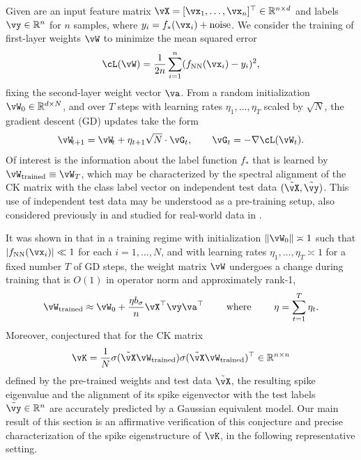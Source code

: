 Given are an input feature matrix
$\vX=[\vx_1,\ldots,\vx_n]^\top \in \R^{n\times d}$ and labels $\vy \in \R^n$
for $n$ samples, where $y_i=f_*(\vx_i)+\text{noise}$.
We consider the training of first-layer weights $\vW$
to minimize the mean squared error
\[\cL(\vW) = {\frac{1}{2n}}\sum_{i=1}^n (f_{\text{NN}}(\vx_i)-y_i)^2,\]
fixing the second-layer weight vector $\va$.
From a random initialization $\vW_0 \in \R^{d \times N}$, and
over $T$ steps with learning rates $\eta_1,\ldots,\eta_T$ scaled by
$\sqrt{N}$, the gradient descent (GD) updates take the form
\begin{equation}\label{eq:trained_W}
	\vW_{\!t+1} = \vW_{\!t} + \eta_{t+1} \sqrt{N}\cdot\vG_t,
\qquad \vG_t=-\nabla\cL(\vW_t).
\end{equation}
Of interest is the information about the label function $f_*$ that is learned by
$\vW_{\text{trained}} \equiv \vW_T$, which may be characterized by the spectral
alignment of the CK matrix with the class label vector on independent
test data $(\tilde \vX,\tilde \vy)$.
This use of independent test data may be understood as a pre-training
setup, also considered previously
in \cite{ba2022high,moniri2023theory} and studied for real-world data in \cite{wei2022more}.

It was shown in \cite{ba2022high} that in a training regime
with initialization $\|\vW_0\| \asymp 1$ such that
$|f_{\text{NN}}(\vx_i)| \ll 1$ for each $i=1,\ldots,N$,
and with learning rates $\eta_1,\ldots,\eta_T \asymp
1$ for a fixed number $T$ of GD steps, the weight matrix $\vW$ undergoes a
change during training that is $O(1)$ in operator norm and approximately rank-1,
\[\vW_{\text{trained}}\approx \vW_0+\frac{\eta b_\sigma}{n}\vX^\top\vy\va^\top \qquad
\text{ where } \qquad \eta=\sum_{t=1}^T \eta_t.\]
Moreover, \cite[Conjecture 4]{ba2022high} conjectured that for the CK matrix
\begin{equation}\label{eq:trained_CK}
\vK=\frac{1}{N} \sigma(\tilde \vX\vW_{\text{trained}})\sigma(\tilde
\vX\vW_{\text{trained}})^\top \in \R^{n \times n}
\end{equation}
defined by the pre-trained weights and test data $\tilde \vX$,
the resulting spike eigenvalue and the alignment of its spike eigenvector with the test labels $\tilde
\vy \in \R^n$ are accurately predicted by a Gaussian equivalent model.
Our main result of this section is an affirmative verification of this
conjecture and precise characterization of the spike eigenstructure of $\vK$,
in the following representative setting.

